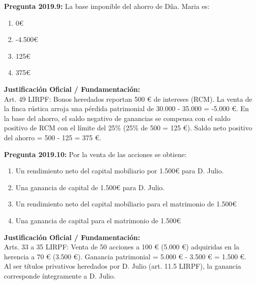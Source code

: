 \documentclass[11pt,a4paper,openany]{article}
\begin{document}
\noindent\textbf{\sffamily Pregunta 2019.9:} La base imponible del ahorro de Dña. Maria es:\\[0.15cm]
\begin{enumerate}[label=\textbf{\alph*)},leftmargin=1.8em,itemsep=1.5pt,topsep=2pt,partopsep=0pt,parsep=0pt]
    \item 0\euro{}
    \item -4.500\euro{}
    \item 125\euro{}
    \item 375\euro{}
\end{enumerate}
\begin{solucionBox}
\textbf{Justificación Oficial / Fundamentación:}\\[0.1cm]
Art. 49 LIRPF: Bonos heredados reportan 500 \euro{} de intereses (RCM). La venta de la finca rústica arroja una pérdida patrimonial de 30.000 - 35.000 = -5.000 \euro{}. En la base del ahorro, el saldo negativo de ganancias se compensa con el saldo positivo de RCM con el límite del 25\% (25\% de 500 = 125 \euro{}). Saldo neto positivo del ahorro = 500 - 125 = 375 \euro{}.
\end{solucionBox}
\vspace{0.35cm}

\noindent\textbf{\sffamily Pregunta 2019.10:} Por la venta de las acciones se obtiene:\\[0.15cm]
\begin{enumerate}[label=\textbf{\alph*)},leftmargin=1.8em,itemsep=1.5pt,topsep=2pt,partopsep=0pt,parsep=0pt]
    \item Un rendimiento neto del capital mobiliario por 1.500\euro{} para D. Julio.
    \item Una ganancia de capital de 1.500\euro{} para D. Julio.
    \item Un rendimiento neto del capital mobiliario para el matrimonio de 1.500\euro{}
    \item Una ganancia de capital para el matrimonio de 1.500\euro{}
\end{enumerate}
\begin{solucionBox}
\textbf{Justificación Oficial / Fundamentación:}\\[0.1cm]
Arts. 33 a 35 LIRPF: Venta de 50 acciones a 100 \euro{} (5.000 \euro{}) adquiridas en la herencia a 70 \euro{} (3.500 \euro{}). Ganancia patrimonial = 5.000 \euro{} - 3.500 \euro{} = 1.500 \euro{}. Al ser títulos privativos heredados por D. Julio (art. 11.5 LIRPF), la ganancia corresponde íntegramente a D. Julio.
\end{solucionBox}
\vspace{0.35cm}
\end{document}
